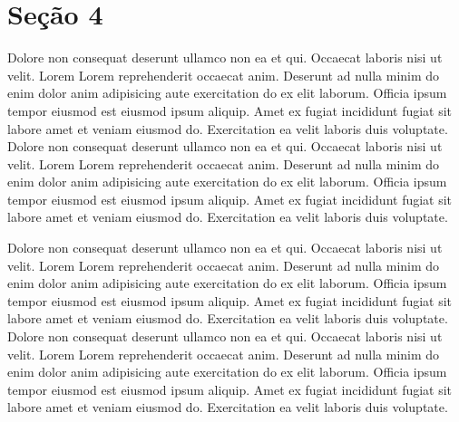 \documentclass[12pt]{report}
\begin{document}
\newpage

\onecolumn %

\section{Seção 4}

Dolore non consequat deserunt ullamco non ea et qui. Occaecat laboris nisi ut velit. Lorem Lorem reprehenderit occaecat anim. Deserunt ad nulla minim do enim dolor anim adipisicing aute exercitation do ex elit laborum. Officia ipsum tempor eiusmod est eiusmod ipsum aliquip. Amet ex fugiat incididunt fugiat sit labore amet et veniam eiusmod do. Exercitation ea velit laboris duis voluptate.
Dolore non consequat deserunt ullamco non ea et qui. Occaecat laboris nisi ut velit. Lorem Lorem reprehenderit occaecat anim. Deserunt ad nulla minim do enim dolor anim adipisicing aute exercitation do ex elit laborum. Officia ipsum tempor eiusmod est eiusmod ipsum aliquip. Amet ex fugiat incididunt fugiat sit labore amet et veniam eiusmod do. Exercitation ea velit laboris duis voluptate.

Dolore non consequat deserunt ullamco non ea et qui. Occaecat laboris nisi ut velit. Lorem Lorem reprehenderit occaecat anim. Deserunt ad nulla minim do enim dolor anim adipisicing aute exercitation do ex elit laborum. Officia ipsum tempor eiusmod est eiusmod ipsum aliquip. Amet ex fugiat incididunt fugiat sit labore amet et veniam eiusmod do. Exercitation ea velit laboris duis voluptate.
Dolore non consequat deserunt ullamco non ea et qui. Occaecat laboris nisi ut velit. Lorem Lorem reprehenderit occaecat anim. Deserunt ad nulla minim do enim dolor anim adipisicing aute exercitation do ex elit laborum. Officia ipsum tempor eiusmod est eiusmod ipsum aliquip. Amet ex fugiat incididunt fugiat sit labore amet et veniam eiusmod do. Exercitation ea velit laboris duis voluptate.

\newpage
\end{document}
